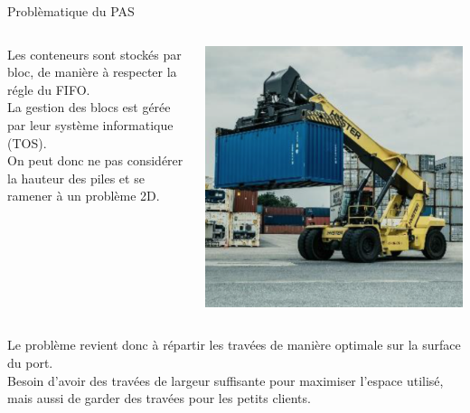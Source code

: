 \begin{frame}{Problèmatique du PAS}
  \begin{columns}
    \begin{column}{0.7\textwidth}
      Les conteneurs sont stockés par bloc, de manière à respecter la régle du FIFO.\\
      La gestion des blocs est gérée par leur système informatique (TOS).\\
      On peut donc ne pas considérer la hauteur des piles et se ramener à un problème 2D.
    \end{column}
    \begin{column}{0.3\textwidth}
      \includegraphics[width=\textwidth]{../images/PAS_stacker}
    \end{column}
  \end{columns}
  \vfill
  Le problème revient donc à répartir les travées de manière optimale sur la surface du port.\\
  Besoin d'avoir des travées de largeur suffisante pour maximiser l'espace utilisé, mais aussi de garder des travées pour les petits clients.
\end{frame}
